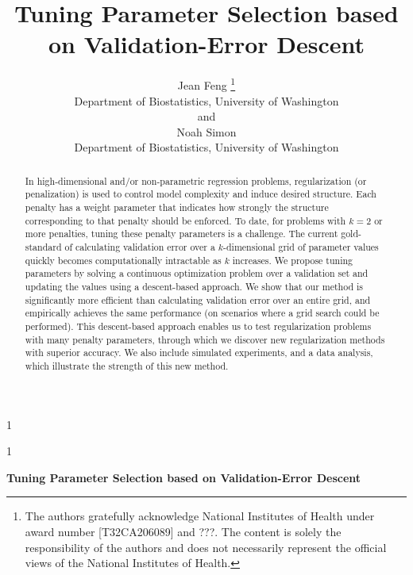 \documentclass[12pt,letterpaper]{article}
\newcommand{\blind}{1}
\begin{document}
%

\def\spacingset#1{\renewcommand{\baselinestretch}%
{#1}\small\normalsize} \spacingset{1}



\blind
{
 
  \title{\bf Tuning Parameter Selection based on Validation-Error Descent}
    \author{Jean Feng
    \thanks{
    The authors gratefully acknowledge National Institutes of Health under award number [T32CA206089] and ???.
    The content is solely the responsibility of the authors and does not necessarily represent the official views of the National Institutes of Health.
    }
    \hspace{.2cm}\\
    Department of Biostatistics, University of Washington\\
    and \\
    Noah Simon \\
    Department of Biostatistics, University of Washington}
  \maketitle
} \fi

\blind
{
  \bigskip
  \bigskip
  \bigskip
  \begin{center}
    {\LARGE\bf Tuning Parameter Selection based on Validation-Error Descent}
\end{center}
  \medskip
} \fi

\bigskip
\begin{abstract}
In high-dimensional and/or non-parametric regression problems, regularization (or penalization) is used to control model complexity and induce desired structure. Each penalty has a weight parameter that indicates how strongly the structure corresponding to that penalty should be enforced. To date, for problems with $k=2$ or more penalties, tuning these penalty parameters is a challenge. The current gold-standard of calculating validation error over a $k$-dimensional grid of parameter values quickly becomes computationally intractable as $k$ increases. We propose tuning parameters by solving a continuous optimization problem over a validation set and updating the values using a descent-based approach. We show that our method is significantly more efficient than calculating validation error over an entire grid, and empirically achieves the same performance (on scenarios where a grid search could be performed). This descent-based approach enables us to test regularization problems with many penalty parameters, through which we discover new regularization methods with superior accuracy. We also include simulated experiments, and a data analysis, which illustrate the strength of this new method.
\end{abstract}
\end{document}
